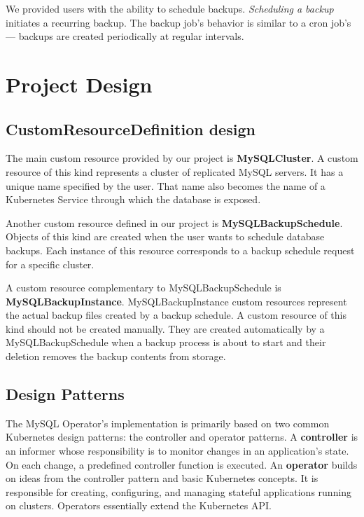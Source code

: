 We provided users with the ability to schedule backups. \textit{Scheduling a backup} initiates a
recurring backup. The backup job’s behavior is similar to a cron job’s --- backups are created
periodically at regular intervals.

\section{Project Design}

\subsection{CustomResourceDefinition design}
The main custom resource provided by our project is \textbf{MySQLCluster}. A custom resource of this kind
represents a cluster of replicated MySQL servers. It has a unique name specified by the user.
That name also becomes the name of a Kubernetes Service through which the database is exposed.

Another custom resource defined in our project is \textbf{MySQLBackupSchedule}. Objects of this kind are created when
the user wants to schedule database backups. Each instance of this resource corresponds to a backup
schedule request for a specific cluster.

A custom resource complementary to MySQLBackupSchedule is \textbf{MySQLBackupInstance}.
MySQLBackupInstance custom resources represent the actual backup files created by a backup schedule.
A custom resource of this kind should not be created manually. They are created automatically
by a MySQLBackupSchedule when a backup process is about to start and their deletion
removes the backup contents from storage.

\subsection{Design Patterns}
The MySQL Operator’s implementation is primarily based on two common Kubernetes design patterns:
the controller and operator patterns. A \textbf{controller} is an informer whose responsibility is
to monitor changes in an application’s state. On each change, a predefined controller function is
executed. An \textbf{operator} builds on ideas from the controller pattern and basic Kubernetes
concepts. It is responsible for creating, configuring, and managing stateful applications running on
clusters. Operators essentially extend the Kubernetes API.

